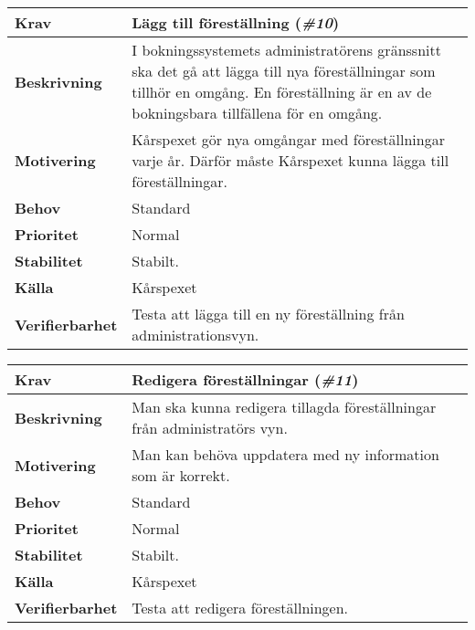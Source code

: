 \documentclass[a4paper, twoside, 11pt, titlepage]{article}
\begin{document}
	\begin{tabular} { p{2.6cm} p{12.5cm} }
		\hline
		\sffamily\textbf{Krav} & Lägg till föreställning (\emph{\#10})  \\
		\hline
		\sffamily\textbf{Beskrivning} & I bokningssystemets administratörens gränssnitt ska det gå att lägga till nya föreställningar som tillhör en omgång. En föreställning är en av de bokningsbara tillfällena för en omgång.  \\
		\hline
		\sffamily\textbf{Motivering} & Kårspexet gör nya omgångar med föreställningar varje år. Därför måste Kårspexet kunna lägga till föreställningar.  \\
		\hline
		\sffamily\textbf{Behov} & Standard  \\
		\hline
		\sffamily\textbf{Prioritet} & Normal  \\
		\hline
		\sffamily\textbf{Stabilitet} & Stabilt.  \\
		\hline
		\sffamily\textbf{Källa} & Kårspexet  \\
		\hline
		\sffamily\textbf{Verifierbarhet} & Testa att lägga till en ny föreställning från administrationsvyn.  \\
		\hline
	\end{tabular}
	\vspace{6mm}

	\begin{tabular} { p{2.6cm} p{12.5cm} }
		\hline
		\sffamily\textbf{Krav} & Redigera föreställningar (\emph{\#11})  \\
		\hline
		\sffamily\textbf{Beskrivning} & Man ska kunna redigera tillagda föreställningar från administratörs vyn.  \\
		\hline
		\sffamily\textbf{Motivering} & Man kan behöva uppdatera med ny information som är korrekt.   \\
		\hline
		\sffamily\textbf{Behov} & Standard  \\
		\hline
		\sffamily\textbf{Prioritet} & Normal  \\
		\hline
		\sffamily\textbf{Stabilitet} & Stabilt.  \\
		\hline
		\sffamily\textbf{Källa} & Kårspexet  \\
		\hline
		\sffamily\textbf{Verifierbarhet} & Testa att redigera föreställningen.  \\
		\hline
	\end{tabular}
	\vspace{6mm}
\end{document}
